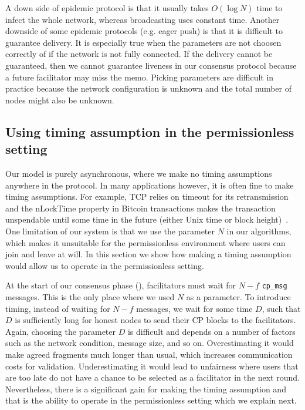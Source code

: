 A down side of epidemic protocol is that it usually takes $O(\log N)$ time to infect the whole network,
whereas broadcasting uses constant time.
Another downside of some epidemic protocols (e.g. eager push) is that it is difficult to guarantee delivery.
It is especially true when the parameters are not choosen correctly of if the network is not fully connected.
If the delivery cannot be guaranteed, 
then we cannot guarantee liveness in our consensus protocol because a future facilitator may miss the memo.
Picking parameters are difficult in practice because the network configuration is unknown and the total number of nodes might also be unknown.


\subsection{Using timing assumption in the permissionless setting}
Our model is purely asynchronous, where we make no timing assumptions anywhere in the protocol.
In many applications however, it is often fine to make timing assumptions.
For example, TCP relies on timeout for its retransmission and the nLockTime property in Bitcoin transactions makes the transaction unspendable until some time in the future (either Unix time or block height)~\cite{bitcoindevguide}.
One limitation of our system is that we use the parameter $N$ in our algorithms, which makes it unsuitable for the permissionless environment where users can join and leave at will.
In this section we show how making a timing assumption would allow us to operate in the permissionless setting.

At the start of our consensus phase (), facilitators must wait for $N-f$ \texttt{cp\_msg} messages.
This is the only place where we used $N$ as a parameter.
To introduce timing, instead of waiting for $N-f$ messages, we wait for some time $D$,
such that $D$ is sufficiently long for honest nodes to send their CP blocks to the facilitators.
Again, choosing the parameter $D$ is difficult and depends on a number of factors such as the network condition, message size, and so on.
Overestimating it would make agreed fragments much longer than usual, which increases communication costs for validation.
Underestimating it would lead to unfairness where users that are too late do not have a chance to be selected as a facilitator in the next round.
Nevertheless, there is a significant gain for making the timing assumption and that is the ability to operate in the permissionless setting which we explain next.

